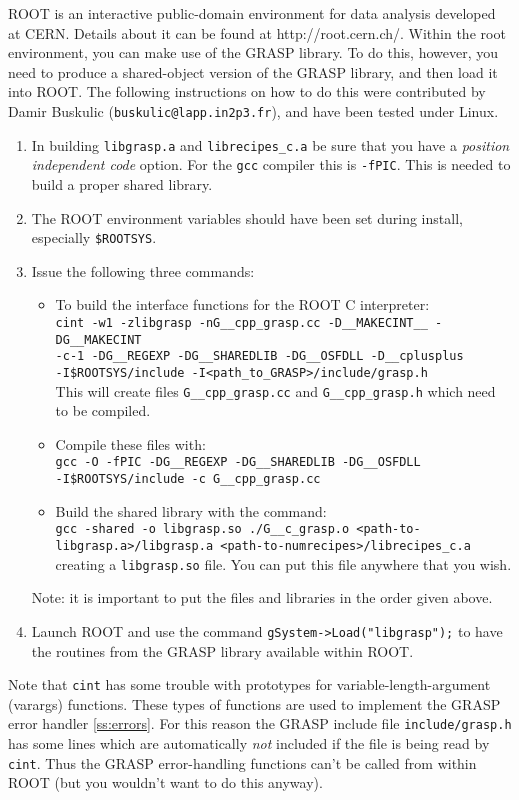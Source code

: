 ROOT is an interactive public-domain environment for data analysis developed
at CERN.  Details about it can be found at
{http://root.cern.ch/}.
Within the root environment, you can make use of the GRASP library.
To do this, however, you need to produce a shared-object version of the
GRASP library, and then load it into ROOT.  The following instructions
on how to do this were contributed by Damir Buskulic ({\tt buskulic@lapp.in2p3.fr}),
and have been tested under Linux.
\begin{enumerate}
\item
In building {\tt libgrasp.a} and {\tt librecipes\_c.a} be sure that you have
a {\it position independent code} option.  For the {\tt gcc} compiler this
is {\tt -fPIC}.  This is needed to build a proper shared library.
\item
The ROOT environment variables should have been set during install,
especially {\tt \$ROOTSYS}.
\item
Issue the following three commands:
\begin{itemize}
\item
To build the interface functions for the ROOT C interpreter:\\
{\tt cint -w1 -zlibgrasp -nG\_\_cpp\_grasp.cc -D\_\_MAKECINT\_\_
-DG\_\_MAKECINT\\
-c-1 -DG\_\_REGEXP -DG\_\_SHAREDLIB -DG\_\_OSFDLL
-D\_\_cplusplus \\ -I\$ROOTSYS/include -I<path\_to\_GRASP>/include/grasp.h}\\

This will create files {\tt G\_\_cpp\_grasp.cc} and {\tt G\_\_cpp\_grasp.h}
which need to be compiled.
\item
Compile these files with:\\
{\tt gcc -O -fPIC -DG\_\_REGEXP -DG\_\_SHAREDLIB -DG\_\_OSFDLL\\
-I\$ROOTSYS/include -c G\_\_cpp\_grasp.cc}\\
\item
Build the shared library with the command:\\
{\tt gcc -shared -o libgrasp.so ./G\_\_c\_grasp.o
<path-to-libgrasp.a>/libgrasp.a <path-to-numrecipes>/librecipes\_c.a}\\
creating a {\tt libgrasp.so} file.  You can put this file anywhere that you wish.
\end{itemize}
Note: it is important to put the files and libraries in the order given
above.
\item
Launch ROOT and use the command {\tt gSystem->Load("libgrasp");} to have the routines
from the GRASP library available within ROOT.
\end{enumerate}
Note that {\tt cint} has some trouble with prototypes for variable-length-argument (varargs) functions. 
These types of functions are used to implement the GRASP error handler \ref{ss:errors}.
For this reason
the GRASP include file {\tt include/grasp.h} has some lines which are
automatically {\it not} included if the file is being read by {\tt cint}.  Thus the
GRASP error-handling functions can't be called from within ROOT (but you
wouldn't want to do this anyway).

